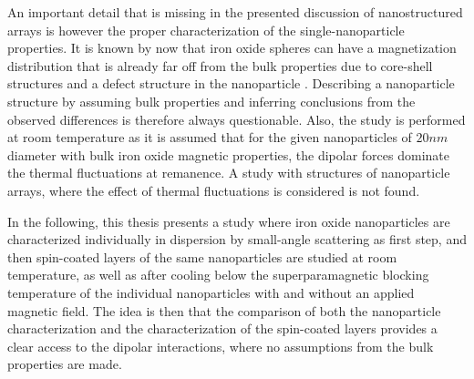 \documentclass[\main/dresen_thesis.tex]{subfiles}
\begin{document}
  An important detail that is missing in the presented discussion of nanostructured arrays is however the proper characterization of the single-nanoparticle properties.
  It is known by now that iron oxide spheres can have a magnetization distribution that is already far off from the bulk properties due to core-shell structures and a defect structure in the nanoparticle \cite{Disch_2012_Quant, Wetterskog_2013_Anoma}.
  Describing a nanoparticle structure by assuming bulk properties and inferring conclusions from the observed differences is therefore always questionable.
  Also, the study is performed at room temperature as it is assumed that for the given nanoparticles of $20 \unit{nm}$ diameter with bulk iron oxide magnetic properties, the dipolar forces dominate the thermal fluctuations at remanence.
  A study with structures of nanoparticle arrays, where the effect of thermal fluctuations is considered is not found.

  In the following, this thesis presents a study where iron oxide nanoparticles are characterized individually in dispersion by small-angle scattering as first step, and then spin-coated layers of the same nanoparticles are studied at room temperature, as well as after cooling below the superparamagnetic blocking temperature of the individual nanoparticles with and without an applied magnetic field.
  The idea is then that the comparison of both the nanoparticle characterization and the characterization of the spin-coated layers provides a clear access to the dipolar interactions, where no assumptions from the bulk properties are made.
\end{document}
